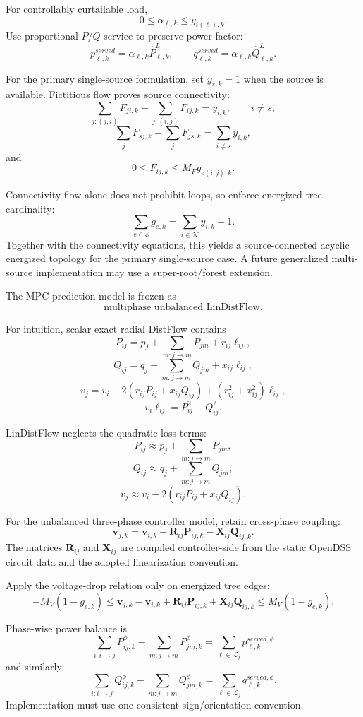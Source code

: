 \documentclass[11pt]{article}
\begin{document}
For controllably curtailable load,
\[
\boxed{0\le\alpha_{\ell,k}\le y_{i(\ell),k}.}
\]
Use proportional $P/Q$ service to preserve power factor:
\[
p_{\ell,k}^{served}=\alpha_{\ell,k}\hat P_{\ell,k}^{L},\qquad
q_{\ell,k}^{served}=\alpha_{\ell,k}\hat Q_{\ell,k}^{L}.
\]

For the primary single-source formulation, set $y_{s,k}=1$ when the source is
available. Fictitious flow proves source connectivity:
\[
\boxed{
\sum_{j:(j,i)}F_{ji,k}-\sum_{j:(i,j)}F_{ij,k}=y_{i,k},
\qquad i\neq s,}
\]
\[
\boxed{
\sum_jF_{sj,k}-\sum_jF_{js,k}=\sum_{i\neq s}y_{i,k},}
\]
and
\[
\boxed{
0\le F_{ij,k}\le M_F g_{e(i,j),k}.}
\]

Connectivity flow alone does not prohibit loops, so enforce energized-tree
cardinality:
\[
\boxed{
\sum_{e\in\mathcal E}g_{e,k}
=
\sum_{i\in\mathcal N}y_{i,k}-1.}
\]
Together with the connectivity equations, this yields a source-connected acyclic
energized topology for the primary single-source case. A future generalized
multi-source implementation may use a super-root/forest extension.

The MPC prediction model is frozen as
\[
\boxed{\text{multiphase unbalanced LinDistFlow}.}
\]

For intuition, scalar exact radial DistFlow contains
\[
P_{ij}=p_j+\sum_{m:j\to m}P_{jm}+r_{ij}\ell_{ij},
\]
\[
Q_{ij}=q_j+\sum_{m:j\to m}Q_{jm}+x_{ij}\ell_{ij},
\]
\[
v_j=v_i-2(r_{ij}P_{ij}+x_{ij}Q_{ij})
+(r_{ij}^2+x_{ij}^2)\ell_{ij},
\]
\[
v_i\ell_{ij}=P_{ij}^2+Q_{ij}^2.
\]

LinDistFlow neglects the quadratic loss terms:
\[
P_{ij}\approx p_j+\sum_{m:j\to m}P_{jm},
\]
\[
Q_{ij}\approx q_j+\sum_{m:j\to m}Q_{jm},
\]
\[
v_j\approx v_i-2(r_{ij}P_{ij}+x_{ij}Q_{ij}).
\]

For the unbalanced three-phase controller model, retain cross-phase coupling:
\[
\boxed{
\mathbf v_{j,k}
=
\mathbf v_{i,k}
-
\mathbf R_{ij}\mathbf P_{ij,k}
-
\mathbf X_{ij}\mathbf Q_{ij,k}.}
\]
The matrices $\mathbf R_{ij}$ and $\mathbf X_{ij}$ are compiled controller-side
from the static OpenDSS circuit data and the adopted linearization convention.

Apply the voltage-drop relation only on energized tree edges:
\[
\boxed{
-M_V(1-g_{e,k})
\le
\mathbf v_{j,k}-\mathbf v_{i,k}
+\mathbf R_{ij}\mathbf P_{ij,k}
+\mathbf X_{ij}\mathbf Q_{ij,k}
\le
M_V(1-g_{e,k}).}
\]

Phase-wise power balance is
\[
\boxed{
\sum_{i:i\to j}P_{ij,k}^{\phi}
-
\sum_{m:j\to m}P_{jm,k}^{\phi}
=
\sum_{\ell\in\mathcal L_j}p_{\ell,k}^{served,\phi}}
\]
and similarly
\[
\boxed{
\sum_{i:i\to j}Q_{ij,k}^{\phi}
-
\sum_{m:j\to m}Q_{jm,k}^{\phi}
=
\sum_{\ell\in\mathcal L_j}q_{\ell,k}^{served,\phi}.}
\]
Implementation must use one consistent sign/orientation convention.
\end{document}
